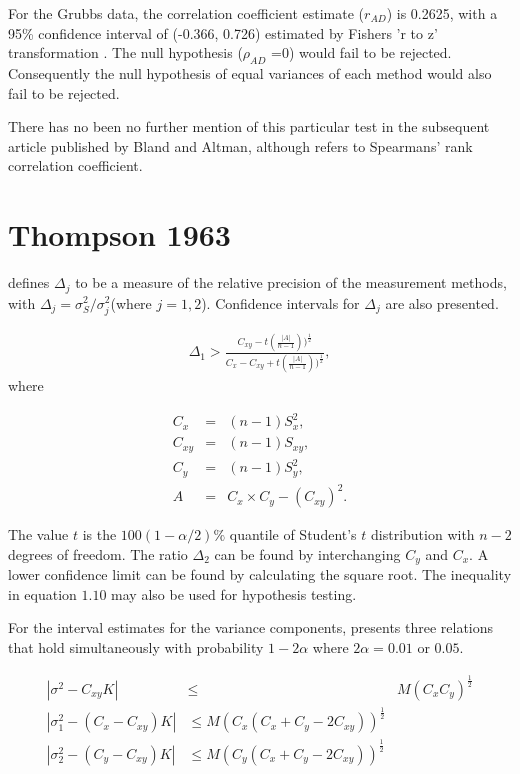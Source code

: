 \documentclass[12pt, a4paper]{article}
\begin{document}
For the Grubbs data, the correlation coefficient estimate
($r_{AD}$) is 0.2625, with a 95\% confidence interval of (-0.366,
0.726) estimated by Fishers 'r to z' transformation \citep{Cohen}.
The null hypothesis ($\rho_{AD}$ =0) would fail to be rejected.
Consequently the null hypothesis of equal variances of each method
would also fail to be rejected.

There has no been no further mention of this particular test in
the subsequent article published by Bland and Altman, although
\citet{BA99} refers to Spearmans' rank correlation coefficient.


\newpage

\section{Thompson 1963}



\citet{Thompson} defines $\Delta_{j}$ to be a measure of the
relative precision of the measurement methods, with $\Delta_{j}=
\sigma^2_{S}/\sigma^2_{j}$(where $j=1,2$). Confidence intervals
for $\Delta_{j}$ are also presented.

\begin{eqnarray}
\Delta_{1} > \frac{C_{xy}-
t(\frac{|A|}{n-1}))^{\frac{1}{2}}}{C_{x}-C_{xy}+
t(\frac{|A|}{n-1}))^{\frac{1}{2}}},
\end{eqnarray}
where

\begin{eqnarray}
C_{x}&=&(n-1)S^2_{x},\nonumber\\
C_{xy}&=&(n-1)S_{xy},\nonumber\\
C_{y}&=&(n-1)S^2_{y},\nonumber\\
A &=& C_{x}\times C_{y} - (C_{xy})^2 . \nonumber
\end{eqnarray}

The value $t$ is the $100(1-\alpha/2)\%$ quantile of Student's $t$
distribution with $n-2$ degrees of freedom. The ratio $\Delta_{2}$
can be found by interchanging $C_{y}$ and $C_{x}$. A lower
confidence limit can be found by calculating the square root. The
inequality in equation $1.10$ may also be used for hypothesis
testing.

For the interval estimates for the variance components,
\citet{Thompson} presents three relations that hold simultaneously
with probability $1-2\alpha$ where $2\alpha=0.01$ or $0.05$.


\begin{eqnarray*}
|\sigma^2-C_{xy}K| &\leqslant& M(C_{x}C_{y})^{\frac{1}{2}}\\
|\sigma^2_{1}-(C_{x}-C_{xy})K|&\leqslant M(C_{x}(C_{x}+C_{y}-2C_{xy}))^{\frac{1}{2}}\nonumber\\
|\sigma^2_{2}-(C_{y}-C_{xy})K|&\leqslant
M(C_{y}(C_{x}+C_{y}-2C_{xy}))^{\frac{1}{2}}\nonumber
\end{eqnarray*}
\end{document}
